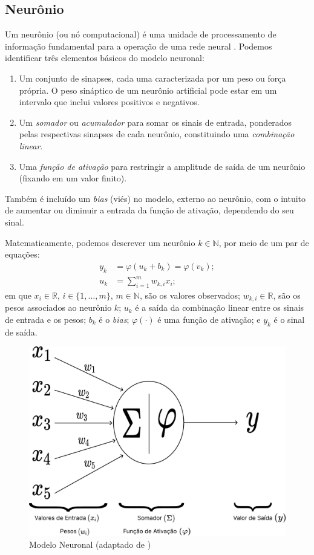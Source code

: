 \documentclass{automatextcc}
\newcommand{\R}{\mathds{R}}
\newcommand{\N}{\mathds{N}}
\begin{document}
\subsection{Neurônio}
Um neurônio (ou nó computacional) é uma unidade de processamento de informação fundamental para a operação de uma rede neural \citep{haykin2001}. Podemos identificar três elementos básicos do modelo neuronal:
\begin{enumerate}
    \item Um conjunto de sinapses, cada uma caracterizada por um peso ou força própria. O peso sináptico de um neurônio artificial pode estar em um intervalo que inclui valores positivos e negativos.
    \item Um \textit{somador} ou \textit{acumulador} para somar os sinais de entrada, ponderados pelas respectivas sinapses de cada neurônio, constituindo uma \textit{combinação linear}.
    \item Uma \textit{função de ativação} para restringir a amplitude de saída de um neurônio (fixando em um valor finito).
\end{enumerate}
Também é incluído um \textit{bias} (viés) no modelo, externo ao neurônio, com o intuito de aumentar ou diminuir a entrada da função de ativação, dependendo do seu sinal.

Matematicamente, podemos descrever um neurônio $k \in \N$, por meio de um par de equações:
\begin{align*}
    y_k &= \varphi(u_k + b_k) = \varphi(v_k);\\[.2cm]
    u_k &= \displaystyle{\sum_{i=1}^{m} }w_{k,i}x_i;
\end{align*}
em que $x_i \in \R$, $i \in \{1,\dots,m\}$, $m \in \N$, são os valores observados; $w_{k,i} \in \R$, são os pesos associados ao neurônio $k$; $u_k$ é a saída da combinação linear entre os sinais de entrada e os pesos; $b_k$ é o \textit{bias}; $\varphi(\cdot)$ é uma função de ativação; e $y_k$ é o sinal de saída.

\begin{figure}
    \centering
    \includegraphics[width=.7\textwidth]{figuras/neuron_model.pdf}
	\caption{Modelo Neuronal (adaptado de \citet{haykin2001,hair2005})}
\end{figure}
\end{document}
